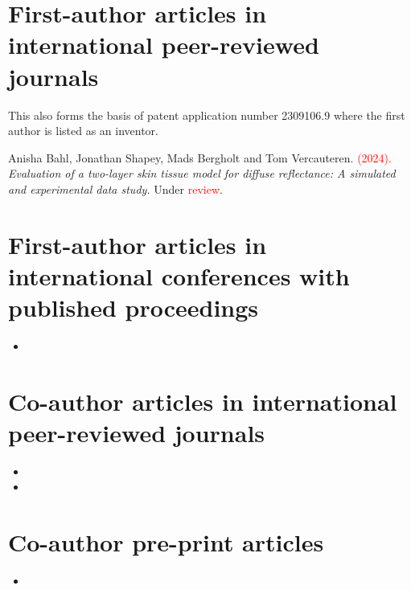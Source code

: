 \section*{First-author articles in international peer-reviewed journals}
\begin{itemize}
\item {} 

This also forms the basis of patent application number 2309106.9 where the first author is listed as an inventor.

\textcolor{red}{\item {}}  


\item Anisha Bahl, Jonathan Shapey, Mads Bergholt and Tom Vercauteren. \textcolor{red}{(2024).} \textit{Evaluation of a two-layer skin tissue model for diffuse reflectance:
A simulated and experimental data study.} Under \textcolor{red}{review}. 
% 
\end{itemize}

\section*{First-author articles in international conferences with published proceedings}%
\begin{itemize}
\item \textcolor{red}{}  
\end{itemize}

\section*{Co-author articles in international peer-reviewed journals}
\begin{itemize}
\item {}

\item {}
\end{itemize}

\section*{Co-author pre-print articles}
\begin{itemize}
\item {}
\end{itemize}
